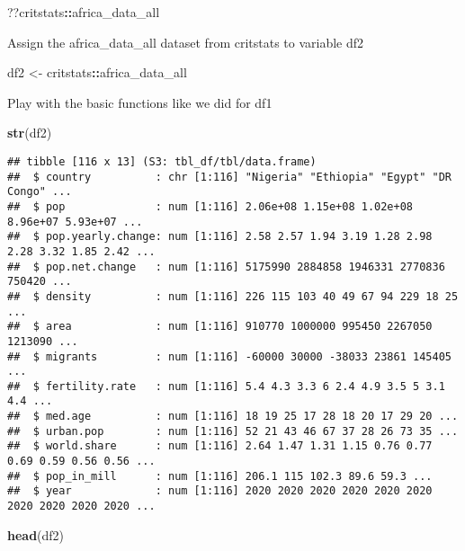 \documentclass[
]{article}
\newenvironment{Shaded}{\begin{snugshade}}{\end{snugshade}}
\newcommand{\FunctionTok}[1]{\textcolor[rgb]{0.13,0.29,0.53}{\textbf{#1}}}
\newcommand{\NormalTok}[1]{#1}
\newcommand{\OtherTok}[1]{\textcolor[rgb]{0.56,0.35,0.01}{#1}}
\newcommand{\SpecialCharTok}[1]{\textcolor[rgb]{0.81,0.36,0.00}{\textbf{#1}}}
\begin{document}
\begin{Shaded}
\begin{Highlighting}[]
\NormalTok{??critstats}\SpecialCharTok{::}\NormalTok{africa\_data\_all }
\end{Highlighting}
\end{Shaded}

Assign the africa\_data\_all dataset from critstats to variable df2

\begin{Shaded}
\begin{Highlighting}[]
\NormalTok{df2 }\OtherTok{\textless{}{-}}\NormalTok{ critstats}\SpecialCharTok{::}\NormalTok{africa\_data\_all}
\end{Highlighting}
\end{Shaded}

Play with the basic functions like we did for df1

\begin{Shaded}
\begin{Highlighting}[]
\FunctionTok{str}\NormalTok{(df2)}
\end{Highlighting}
\end{Shaded}

\begin{verbatim}
## tibble [116 x 13] (S3: tbl_df/tbl/data.frame)
##  $ country          : chr [1:116] "Nigeria" "Ethiopia" "Egypt" "DR Congo" ...
##  $ pop              : num [1:116] 2.06e+08 1.15e+08 1.02e+08 8.96e+07 5.93e+07 ...
##  $ pop.yearly.change: num [1:116] 2.58 2.57 1.94 3.19 1.28 2.98 2.28 3.32 1.85 2.42 ...
##  $ pop.net.change   : num [1:116] 5175990 2884858 1946331 2770836 750420 ...
##  $ density          : num [1:116] 226 115 103 40 49 67 94 229 18 25 ...
##  $ area             : num [1:116] 910770 1000000 995450 2267050 1213090 ...
##  $ migrants         : num [1:116] -60000 30000 -38033 23861 145405 ...
##  $ fertility.rate   : num [1:116] 5.4 4.3 3.3 6 2.4 4.9 3.5 5 3.1 4.4 ...
##  $ med.age          : num [1:116] 18 19 25 17 28 18 20 17 29 20 ...
##  $ urban.pop        : num [1:116] 52 21 43 46 67 37 28 26 73 35 ...
##  $ world.share      : num [1:116] 2.64 1.47 1.31 1.15 0.76 0.77 0.69 0.59 0.56 0.56 ...
##  $ pop_in_mill      : num [1:116] 206.1 115 102.3 89.6 59.3 ...
##  $ year             : num [1:116] 2020 2020 2020 2020 2020 2020 2020 2020 2020 2020 ...
\end{verbatim}

\begin{Shaded}
\begin{Highlighting}[]
\FunctionTok{head}\NormalTok{(df2)}
\end{Highlighting}
\end{Shaded}
\end{document}
